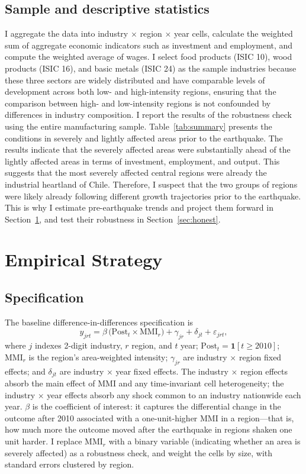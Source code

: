 \documentclass[12pt]{article}
\begin{document}
\subsection{Sample and descriptive statistics}
I aggregate the data into industry $\times$ region $\times$ year cells, calculate the weighted sum
of aggregate economic indicators such as investment and employment, and compute the weighted average
of wages. I select food products (ISIC 10), wood products (ISIC 16), and basic metals (ISIC 24) as
the sample industries because these three sectors are widely distributed and have comparable levels
of development across both low- and high-intensity regions, ensuring that the comparison between
high- and low-intensity regions is not confounded by differences in industry composition. I report
the results of the robustness check using the entire manufacturing sample.
Table~\ref{tab:summary} presents the conditions in severely and lightly affected areas prior to the
earthquake. The results indicate that the severely affected areas were substantially ahead of the
lightly affected areas in terms of investment, employment, and output. This suggests that the most
severely affected central regions were already the industrial heartland of Chile. Therefore, I
suspect that the two groups of regions were likely already following different growth trajectories
prior to the earthquake. This is why I estimate pre-earthquake trends and project them forward in
Section~\ref{sec:strategy}, and test their robustness in Section~\ref{sec:honest}.



\FloatBarrier
\section{Empirical Strategy}\label{sec:strategy}

\subsection{Specification}
The baseline difference-in-differences specification is
\begin{equation}
y_{jrt} = \beta\,\big(\text{Post}_t \times \text{MMI}_r\big) + \gamma_{jr} + \delta_{jt} + \varepsilon_{jrt},
\end{equation}
where $j$ indexes 2-digit industry, $r$ region, and $t$ year; $\text{Post}_t = \mathbf{1}[t \geq 2010]$;
$\text{MMI}_r$ is the region's area-weighted intensity; $\gamma_{jr}$ are industry $\times$ region
fixed effects; and $\delta_{jt}$ are industry $\times$ year fixed effects. The industry $\times$
region effects absorb the main effect of MMI and any time-invariant cell heterogeneity; the industry
$\times$ year effects absorb any shock common to an industry nationwide each year. $\beta$ is the
coefficient of interest: it captures the differential change in the outcome after 2010 associated
with a one-unit-higher MMI in a region---that is, how much more the outcome moved after the earthquake
in regions shaken one unit harder. I replace $\text{MMI}_r$ with a binary variable (indicating whether
an area is severely affected) as a robustness check, and weight the cells by size, with standard errors
clustered by region.
\end{document}
